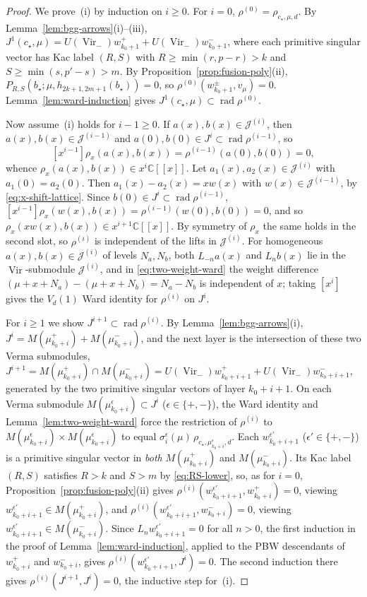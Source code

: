 \documentclass[twoside,10pt]{article}
\numberwithin{equation}{section}
\theoremstyle{slbody}
\theoremstyle{definition}
\theoremstyle{remark}
\newcommand{\Vir}{\operatorname{Vir}}
\newcommand{\rad}{\operatorname{rad}}
\begin{document}
\begin{proof}
We prove~(i) by induction on \(i\geq0\).  For \(i=0\),
\(\rho^{(0)}=\rho_{c_\star,\mu,d}\).  By Lemma~\ref{lem:bgg-arrows}(i)--(iii),
\(J^1(c_\star,\mu)=U(\Vir_-)w^+_{k_0+1}+U(\Vir_-)w^-_{k_0+1}\), where each
primitive singular vector has Kac label \((R,S)\) with
\(R\geq\min(r,p-r)>k\) and \(S\geq\min(s,p'-s)>m\).  By
Proposition~\ref{prop:fusion-poly}(ii),
\(P_{R,S}(b_\star;\mu,h_{2k+1,2m+1}(b_\star))=0\), so
\(\rho^{(0)}(w^\pm_{k_0+1},v_\mu)=0\).  Lemma~\ref{lem:ward-induction} gives
\(J^1(c_\star,\mu)\subset\rad\rho^{(0)}\).

Now assume~(i) holds for \(i-1\geq0\).  If \(a(x),b(x)\in\mathcal{J}^{(i)}\),
then \(a(x),b(x)\in\mathcal{J}^{(i-1)}\) and
\(a(0),b(0)\in J^i\subset\rad\rho^{(i-1)}\), so
\[
 [x^{i-1}]\rho_x(a(x),b(x))=\rho^{(i-1)}(a(0),b(0))=0,
\]
whence \(\rho_x(a(x),b(x))\in x^i\mathbb{C}[[x]]\).  Let
\(a_1(x),a_2(x)\in\mathcal{J}^{(i)}\) with \(a_1(0)=a_2(0)\).  Then
\(a_1(x)-a_2(x)=xw(x)\) with \(w(x)\in\mathcal{J}^{(i-1)}\),
by
\eqref{eq:x-shift-lattice}.  Since \(b(0)\in J^i\subset\rad\rho^{(i-1)}\),
\([x^{i-1}]\rho_x(w(x),b(x))=\rho^{(i-1)}(w(0),b(0))=0\), and so
\(\rho_x(xw(x),b(x))\in x^{i+1}\mathbb{C}[[x]]\).  By symmetry of \(\rho_x\)
the same holds in the second slot, so \(\rho^{(i)}\) is independent of the
lifts in \(\mathcal{J}^{(i)}\).  For homogeneous
\(a(x),b(x)\in\mathcal{J}^{(i)}\) of levels \(N_a,N_b\), both \(L_{-n}a(x)\)
and \(L_nb(x)\) lie in the \(\Vir\)-submodule \(\mathcal{J}^{(i)}\), and in
\eqref{eq:two-weight-ward} the weight difference
\((\mu+x+N_a)-(\mu+x+N_b)=N_a-N_b\) is independent of \(x\); taking \([x^i]\)
gives the \(V_d(1)\) Ward identity for \(\rho^{(i)}\) on \(J^i\).

For \(i\geq1\) we show \(J^{i+1}\subset\rad\rho^{(i)}\).  By
Lemma~\ref{lem:bgg-arrows}(i), \(J^i=M(\mu^+_{k_0+i})+M(\mu^-_{k_0+i})\), and the
next layer is the intersection of these two Verma submodules,
\(J^{i+1}=M(\mu^+_{k_0+i})\cap M(\mu^-_{k_0+i})
=U(\Vir_-)w^+_{k_0+i+1}+U(\Vir_-)w^-_{k_0+i+1}\), generated by the two
primitive singular vectors of layer \(k_0+i+1\).  On each Verma submodule \(M(\mu^\epsilon_{k_0+i})\subset J^i\)
(\(\epsilon\in\{+,-\}\)), the Ward identity and
Lemma~\ref{lem:two-weight-ward} force the restriction of \(\rho^{(i)}\) to
\(M(\mu^\epsilon_{k_0+i})\times M(\mu^\epsilon_{k_0+i})\) to equal
\(\sigma^\epsilon_i(\mu)\,\rho_{c_\star,\mu^\epsilon_{k_0+i},d}\).  Each
\(w^{\epsilon'}_{k_0+i+1}\) (\(\epsilon'\in\{+,-\}\)) is a primitive singular vector in
\emph{both} \(M(\mu^+_{k_0+i})\) and \(M(\mu^-_{k_0+i})\).  Its Kac label
\((R,S)\) satisfies \(R>k\) and \(S>m\) by \eqref{eq:RS-lower}, so, as for
\(i=0\), Proposition~\ref{prop:fusion-poly}(ii) gives
\(\rho^{(i)}(w^{\epsilon'}_{k_0+i+1},w^+_{k_0+i})=0\), viewing
\(w^{\epsilon'}_{k_0+i+1}\in M(\mu^+_{k_0+i})\), and
\(\rho^{(i)}(w^{\epsilon'}_{k_0+i+1},w^-_{k_0+i})=0\), viewing
\(w^{\epsilon'}_{k_0+i+1}\in M(\mu^-_{k_0+i})\).  Since
\(L_nw^{\epsilon'}_{k_0+i+1}=0\) for all \(n>0\), the first induction in the proof of
Lemma~\ref{lem:ward-induction}, applied to the PBW descendants of
\(w^+_{k_0+i}\) and \(w^-_{k_0+i}\), gives
\(\rho^{(i)}(w^{\epsilon'}_{k_0+i+1},J^i)=0\).  The second induction there gives
\(\rho^{(i)}(J^{i+1},J^i)=0\), the inductive step for~(i).


\end{proof}
\end{document}
